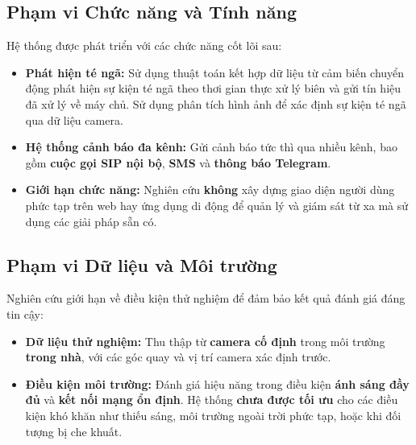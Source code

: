 \subsection{Phạm vi Chức năng và Tính năng}
Hệ thống được phát triển với các chức năng cốt lõi sau:
\begin{itemize}
    \item \textbf{Phát hiện té ngã:} Sử dụng thuật toán kết hợp dữ liệu từ cảm biến chuyển động phát hiện sự kiện té ngã theo thơi gian thực xử lý biên và gửi tín hiệu đã xử lý về máy chủ. Sử dụng phân tích hình ảnh để xác định sự kiện té ngã qua dữ liệu camera.
    
    \item \textbf{Hệ thống cảnh báo đa kênh:} Gửi cảnh báo tức thì qua nhiều kênh, bao gồm \textbf{cuộc gọi SIP nội bộ}, \textbf{SMS} và \textbf{thông báo Telegram}.
    
    \item \textbf{Giới hạn chức năng:} Nghiên cứu \textbf{không} xây dựng giao diện người dùng phức tạp trên web hay ứng dụng di động để quản lý và giám sát từ xa mà sử dụng các giải pháp sẵn có.
\end{itemize}

\subsection{Phạm vi Dữ liệu và Môi trường}
Nghiên cứu giới hạn về điều kiện thử nghiệm để đảm bảo kết quả đánh giá đáng tin cậy:
\begin{itemize}
    \item \textbf{Dữ liệu thử nghiệm:} Thu thập từ \textbf{camera cố định} trong môi trường \textbf{trong nhà}, với các góc quay và vị trí camera xác định trước.
    
    \item \textbf{Điều kiện môi trường:} Đánh giá hiệu năng trong điều kiện \textbf{ánh sáng đầy đủ} và \textbf{kết nối mạng ổn định}. Hệ thống \textbf{chưa được tối ưu} cho các điều kiện khó khăn như thiếu sáng, môi trường ngoài trời phức tạp, hoặc khi đối tượng bị che khuất.
\end{itemize}
